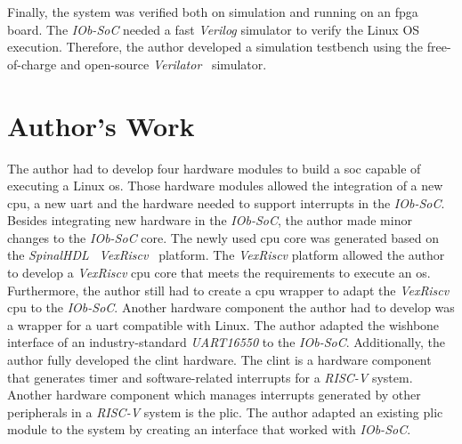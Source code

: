 Finally, the system was verified both on simulation and running on an \acrshort{fpga} board. The \textit{IOb-SoC} needed a fast \textit{Verilog} simulator to verify the Linux OS execution. Therefore, the author developed a simulation testbench using the free-of-charge and open-source \textit{Verilator}~\cite{snyder2010verilator} simulator.

\section{Author's Work}
\label{section:authors_work}
The author had to develop four hardware modules to build a \acrfull{soc} capable of executing a Linux \acrshort{os}. Those hardware modules allowed the integration of a new \acrshort{cpu}, a new \acrshort{uart} and the hardware needed to support interrupts in the \textit{IOb-SoC}. Besides integrating new hardware in the \textit{IOb-SoC}, the author made minor changes to the \textit{IOb-SoC} core. The newly used \acrshort{cpu} core was generated based on the \textit{SpinalHDL}~\cite{papon2017spinalhdl} \textit{VexRiscv}~\cite{vexriscv} platform. The \textit{VexRiscv} platform allowed the author to develop a \textit{VexRiscv} \acrshort{cpu} core that meets the requirements to execute an \acrlong{os}. Furthermore, the author still had to create a \acrshort{cpu} wrapper to adapt the \textit{VexRiscv} \acrshort{cpu} to the \textit{IOb-SoC}. Another hardware component the author had to develop was a wrapper for a \acrshort{uart} compatible with Linux. The author adapted the wishbone interface of an industry-standard \textit{UART16550} to the \textit{IOb-SoC}. Additionally, the author fully developed the \acrshort{clint} hardware. The \acrshort{clint} is a hardware component that generates timer and software-related interrupts for a \textit{RISC-V} system. Another hardware component which manages interrupts generated by other peripherals in a \textit{RISC-V} system is the \acrshort{plic}. The author adapted an existing \acrshort{plic} module to the system by creating an interface that worked with \textit{IOb-SoC}.

